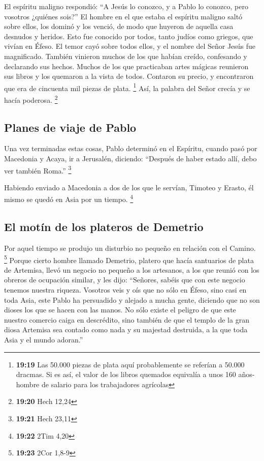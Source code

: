 \begin{paracol}{2}
 El espíritu maligno respondió: ``A Jesús lo conozco, y a
Pablo lo conozco, pero vosotros ¿quiénes sois?''  El
hombre en el que estaba el espíritu maligno saltó sobre ellos, los
dominó y los venció, de modo que huyeron de aquella casa desnudos y
heridos.  Esto fue conocido por todos, tanto judíos como
griegos, que vivían en Éfeso. El temor cayó sobre todos ellos, y el
nombre del Señor Jesús fue magnificado.  También vinieron
muchos de los que habían creído, confesando y declarando sus hechos.
 Muchos de los que practicaban artes mágicas reunieron
sus libros y los quemaron a la vista de todos. Contaron su precio, y
encontraron que era de cincuenta mil piezas de plata. \footnote{\textbf{19:19}
  Las 50.000 piezas de plata aquí probablemente se referían a 50.000
  dracmas. Si es así, el valor de los libros quemados equivalía a unos
  160 años-hombre de salario para los trabajadores agrícolas}
 Así, la palabra del Señor crecía y se hacía poderosa.
\footnote{\textbf{19:20} Hech 12,24}

\hypertarget{planes-de-viaje-de-pablo}{%
\subsection{Planes de viaje de Pablo}\label{planes-de-viaje-de-pablo}}

 Una vez terminadas estas cosas, Pablo determinó en el
Espíritu, cuando pasó por Macedonia y Acaya, ir a Jerusalén, diciendo:
``Después de haber estado allí, debo ver también Roma.'' \footnote{\textbf{19:21}
  Hech 23,11}

 Habiendo enviado a Macedonia a dos de los que le
servían, Timoteo y Erasto, él mismo se quedó en Asia por un tiempo.
\footnote{\textbf{19:22} 2Tim 4,20}

\hypertarget{el-motuxedn-de-los-plateros-de-demetrio}{%
\subsection{El motín de los plateros de
Demetrio}\label{el-motuxedn-de-los-plateros-de-demetrio}}

 Por aquel tiempo se produjo un disturbio no pequeño en
relación con el Camino. \footnote{\textbf{19:23} 2Cor 1,8-9}
 Porque cierto hombre llamado Demetrio, platero que hacía
santuarios de plata de Artemisa, llevó un negocio no pequeño a los
artesanos,  a los que reunió con los obreros de ocupación
similar, y les dijo: ``Señores, sabéis que con este negocio tenemos
nuestra riqueza.  Vosotros veis y oís que no sólo en
Éfeso, sino casi en toda Asia, este Pablo ha persuadido y alejado a
mucha gente, diciendo que no son dioses los que se hacen con las manos.
 No sólo existe el peligro de que este nuestro comercio
caiga en descrédito, sino también de que el templo de la gran diosa
Artemisa sea contado como nada y su majestad destruida, a la que toda
Asia y el mundo adoran.''


\end{paracol}
